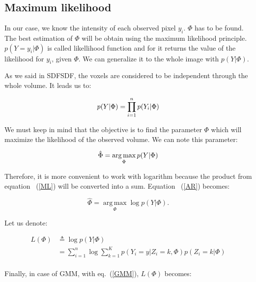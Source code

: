 \subsection{Maximum likelihood}
In our case, we know the intensity of each observed pixel $y_i$. $\Phi$ has to be found. The best estimation of $\Phi$ will be obtain using the maximum likelihood principle. $p(Y=y_i|\Phi)$ is called likellihood function and for it returns the value of the likelihood for $y_i$, given $\Phi$. We can generalize it to the whole image with $p(Y|\Phi)$.
\par
As we said in SDFSDF, the voxels are considered to be independent through the whole volume. It leads us to:
 
  \begin{equation}\label{ML}
  p(Y|\Phi)= \prod_{i=1}^n p(Y_i|\Phi)\\
  \end{equation}

\par
We must keep in mind that the objective is to find the parameter $\Phi$ which will maximize the likelihood of the observed volume. We can note this parameter:
  
  \begin{equation}\label{AR}
  \hat{\Phi}=\operatorname*{arg\,max}_\Phi p(Y|\Phi)\\
  \end{equation}

\par
Therefore, it is more convenient to work with logarithm because the product from equation ~(\ref{ML}) will be converted into a sum. Equation ~(\ref{AR}) becomes:
  
  \begin{equation}\label{ARL}
  \hat{\Phi}=\operatorname*{arg\,max}_\Phi \operatorname*{log} p(Y|\Phi). %
  \end{equation}

Let us denote:

  \begin{align*}
  L(\Phi) &\triangleq \operatorname*{log} p(Y|\Phi) \\
          &= \sum_{i=1}^n \operatorname*{log}\sum_{k=1}^K p(Y_i=y|Z_i=k,\Phi)p(Z_i=k|\Phi)\\
  \end{align*} 

Finally, in case of GMM, with eq.~(\ref{GMM}), $L(\Phi)$ becomes:
  
